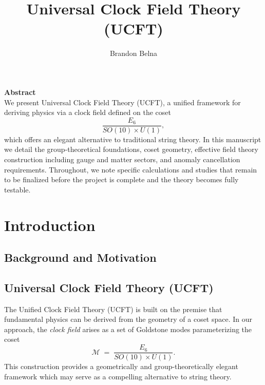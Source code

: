 \documentclass[aps,prd,preprint,groupedaddress]{revtex4-2}
\begin{document}


\title{Universal Clock Field Theory (UCFT)}

\author{Brandon Belna}

\maketitle
{\centering \textbf{Abstract}\\}
We present Universal Clock Field Theory (UCFT), a unified framework for deriving physics via a clock field defined on the coset 
\[
\frac{E_6}{SO(10)\times U(1)},
\]
which offers an elegant alternative to traditional string theory. In this manuscript we detail the group-theoretical foundations, coset geometry, effective field theory construction including gauge and matter sectors, and anomaly cancellation requirements. Throughout, we note specific calculations and studies that remain to be finalized before the project is complete and the theory becomes fully testable.
\clearpage
\tableofcontents
\clearpage

\setcounter{page}{1}  %

\section{Introduction}

\subsection{Background and Motivation}

\subsection{Universal Clock Field Theory (UCFT)}
The Unified Clock Field Theory (UCFT) is built on the premise that fundamental physics can be derived from the geometry of a coset space. In our approach, the \emph{clock field} arises as a set of Goldstone modes parameterizing the coset
\[
\mathcal{M} \;=\; \frac{E_6}{SO(10)\times U(1)}.
\]
This construction provides a geometrically and group-theoretically elegant framework which may serve as a compelling alternative to string theory.
\end{document}

